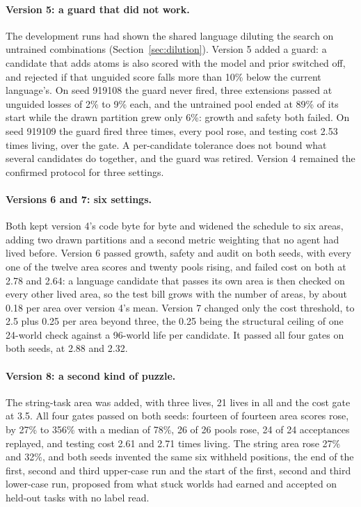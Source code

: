 \documentclass[11pt]{article}
\begin{document}
\paragraph{Version 5: a guard that did not work.} The development runs had shown the shared language diluting the search on untrained combinations (Section~\ref{sec:dilution}). Version 5 added a guard: a candidate that adds atoms is also scored with the model and prior switched off, and rejected if that unguided score falls more than 10\% below the current language's. On seed 919108 the guard never fired, three extensions passed at unguided losses of 2\% to 9\% each, and the untrained pool ended at 89\% of its start while the drawn partition grew only 6\%: growth and safety both failed. On seed 919109 the guard fired three times, every pool rose, and testing cost 2.53 times living, over the gate. A per-candidate tolerance does not bound what several candidates do together, and the guard was retired. Version 4 remained the confirmed protocol for three settings.

\paragraph{Versions 6 and 7: six settings.} Both kept version 4's code byte for byte and widened the schedule to six areas, adding two drawn partitions and a second metric weighting that no agent had lived before. Version 6 passed growth, safety and audit on both seeds, with every one of the twelve area scores and twenty pools rising, and failed cost on both at 2.78 and 2.64: a language candidate that passes its own area is then checked on every other lived area, so the test bill grows with the number of areas, by about 0.18 per area over version 4's mean. Version 7 changed only the cost threshold, to 2.5 plus 0.25 per area beyond three, the 0.25 being the structural ceiling of one 24-world check against a 96-world life per candidate. It passed all four gates on both seeds, at 2.88 and 2.32.
\paragraph{Version 8: a second kind of puzzle.} The string-task area was added, with three lives, 21 lives in all and the cost gate at 3.5. All four gates passed on both seeds: fourteen of fourteen area scores rose, by 27\% to 356\% with a median of 78\%, 26 of 26 pools rose, 24 of 24 acceptances replayed, and testing cost 2.61 and 2.71 times living. The string area rose 27\% and 32\%, and both seeds invented the same six withheld positions, the end of the first, second and third upper-case run and the start of the first, second and third lower-case run, proposed from what stuck worlds had earned and accepted on held-out tasks with no label read.
\end{document}
